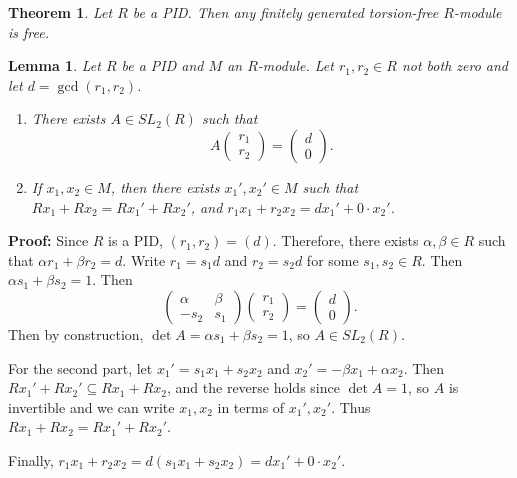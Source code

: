 \documentclass[12pt]{article}
\newtheorem{theorem}{Theorem}[section]
\newtheorem{lemma}{Lemma}[section]
\theoremstyle{definition}
\theoremstyle{remark}
\begin{document}
\begin{theorem}
	Let $R$ be a PID. Then any finitely generated torsion-free $R$-module is free.
\end{theorem}

\begin{lemma}
	Let $R$ be a PID and $M$ an $R$-module. Let $r_1, r_2 \in R$ not both zero and let $d = \gcd(r_1, r_2)$.
	\begin{enumerate}[label = \normalfont(\roman*)]
		\item There exists $A \in SL_{2}(R)$ such that
			\[
			A
			\begin{pmatrix}
				r_1 \\
				r_2
			\end{pmatrix}
			=
			\begin{pmatrix}
				d \\
				0
			\end{pmatrix}
			.\]
		\item If $x_1, x_2 \in M$, then there exists $x_1', x_2' \in M$ such that $Rx_1 + Rx_2 = Rx_1' + Rx_2'$, and $r_1x_1 + r_2x_2 = dx_1' + 0 \cdot x_2'$.
	\end{enumerate}
	
\end{lemma}

\begin{adjustbox}{minipage = \columnwidth - 25.5pt, margin=1em, frame=1pt, margin=0em}
	\textbf{Proof:} Since $R$ is a PID, $(r_1, r_2) = (d)$. Therefore, there exists $\alpha, \beta \in R$ such that $\alpha r_1 + \beta r_2 = d$. Write $r_1 = s_1d$ and $r_2 = s_2d$ for some $s_1, s_2 \in R$. Then $\alpha s_1 + \beta s_2 = 1$. Then
	\[
	\begin{pmatrix}
		\alpha & \beta \\
		-s_2 & s_1
	\end{pmatrix}
	\begin{pmatrix}
		r_1 \\
		r_2
	\end{pmatrix}
	=
	\begin{pmatrix}
		d \\
		0
	\end{pmatrix}
	.\]
	Then by construction, $\det A = \alpha s_1 + \beta s_2 = 1$, so $A \in SL_2(R)$.

	For the second part, let $x_1' = s_1x_1 + s_2x_2$ and $x_2' = -\beta x_1 + \alpha x_2$. Then $Rx_1' + Rx_2' \subseteq Rx_1 + Rx_2$, and the reverse holds since $\det A = 1$, so $A$ is invertible and we can write $x_1, x_2$ in terms of $x_1', x_2'$. Thus $Rx_1 + Rx_2 = Rx_1' + Rx_2'$.

	Finally, $r_1x_1 + r_2x_2 = d(s_1x_1 + s_2x_2) = dx_1' + 0 \cdot x_2'$.
\end{adjustbox}
\end{document}
